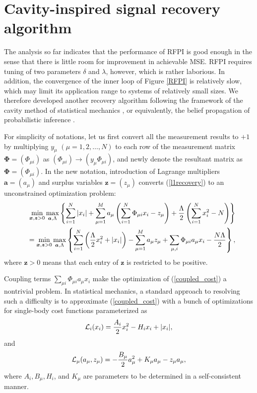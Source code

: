 \documentclass[12pt]{iopart}
\newcommand{\vm}[1]{\boldsymbol{#1}}
\begin{document}
\section{Cavity-inspired signal recovery algorithm}
\label{CISR}
The analysis so far indicates that the performance of RFPI is good enough in the sense that there is little room for improvement in achievable MSE. RFPI requires tuning of two parameters $\delta$ and $\lambda$, however, which is rather laborious. In addition, the convergence of the inner loop of Figure \ref{RFPI} is relatively slow, which may limit its application range to systems of relatively small sizes. We therefore developed another recovery algorithm following the framework of the cavity method of statistical mechanics \cite{cavity,MezardMontanari2009}, or equivalently, the belief propagation of probabilistic inference \cite{BP3,BP1}. 

For simplicity of notations, let us first convert all the measurement results to $+1$ by multiplying $y_{\mu}$ $(\mu=1,2,\ldots, N)$ to each row of the measurement matrix $\vm{\Phi}=(\Phi_{\mu i})$ as $(\Phi_{\mu i}) \to (y_\mu \Phi_{\mu i})$, and newly denote the resultant matrix as $\vm{\Phi}=(\Phi_{\mu i})$.
In the new notation, introduction of Lagrange multipliers $\vm{a}=(a_\mu)$ and surplus variables $\vm{z}=(z_\mu)$ converts (\ref{l1recovery}) to an unconstrained optimization problem: 
\begin{eqnarray}
&&\mathop{\rm min}_{\vm{x},\vm{ z} > 0} \mathop{\rm max}_{\vm{a},\Lambda} 
\left \{
\sum_{i=1}^N |x_i|+\sum_{\mu=1}^M a_\mu \left (\sum_{i=1}^N \Phi_{\mu i} x_i-z_\mu \right )
+\frac{\Lambda}{2}\left (\sum_{i=1}^N x_i^2-N \right ) \right \} \cr
&& =
\mathop{\rm min}_{\vm{ x},\vm{ z} > 0} \mathop{\rm max}_{\vm{a},\Lambda} 
\left \{
\sum_{i=1}^N \left (\frac{\Lambda}{2} x_i^2 + |x_i| \right )-\sum_{\mu=1}^Ma_\mu z_{\mu}
+\sum_{\mu,i} \Phi_{\mu i} a_\mu x_i -\frac{N\Lambda}{2} \right \},   
\label{coupled_cost}
\end{eqnarray}
where $\vm{z}>0$ means that each entry of $\vm{z}$ is restricted to be positive. 

Coupling terms $\sum_{\mu i} \Phi_{\mu i} a_\mu x_i$ make the optimization of (\ref{coupled_cost}) a nontrivial problem. In statistical mechanics, a standard approach to resolving such a difficulty is to approximate 
(\ref{coupled_cost}) with a bunch of optimizations for single-body  
cost functions parameterized as 
\begin{eqnarray}
{\cal L}_i(x_i)=\frac{A_i}{2} x_i^2-H_i x_i +|x_i|, 
\label{x_cost}
\end{eqnarray}
and
\begin{eqnarray}
{\cal L}_\mu(a_\mu,z_\mu)
=-\frac{B_\mu}{2}a_\mu^2+K_\mu a_\mu-z_\mu a_\mu, 
\label{mu_cost}
\end{eqnarray}
where $A_i,B_\mu,H_i$, and $K_\mu$ are parameters to be determined in a self-consistent manner. 
\end{document}
